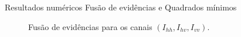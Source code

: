 \documentclass[10pt]{beamer}
\begin{document}
\begin{frame}{Resultados numéricos}
\alert{Fusão de evidências e Quadrados mínimos}
\begin{figure}[hbt]
	\caption{Fusão de evidências para os canais $\left(I_{hh}, I_{hv}, I_{vv}\right)$.}
\label{cap_acf_fig11}
\endminipage\hfill
{}

\end{figure}
\end{frame}
\end{document}
